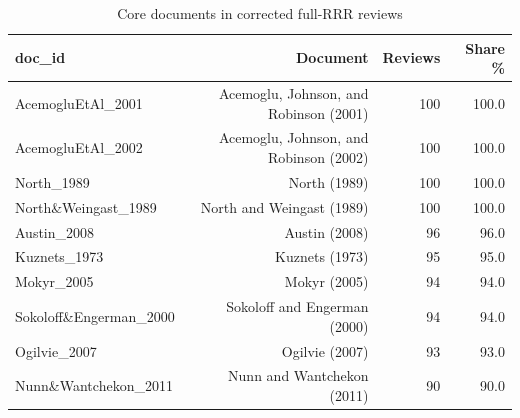 \begin{table}[ht]
\centering
\caption{Core documents in corrected full-RRR reviews}
\scriptsize
\begin{tabular}{lrrr}
\toprule
doc\_id & Document & Reviews & Share \% \\
\midrule
AcemogluEtAl\_2001 & Acemoglu, Johnson, and Robinson (2001) & 100 & 100.0 \\
AcemogluEtAl\_2002 & Acemoglu, Johnson, and Robinson (2002) & 100 & 100.0 \\
North\_1989 & North (1989) & 100 & 100.0 \\
North\&Weingast\_1989 & North and Weingast (1989) & 100 & 100.0 \\
Austin\_2008 & Austin (2008) & 96 & 96.0 \\
Kuznets\_1973 & Kuznets (1973) & 95 & 95.0 \\
Mokyr\_2005 & Mokyr (2005) & 94 & 94.0 \\
Sokoloff\&Engerman\_2000 & Sokoloff and Engerman (2000) & 94 & 94.0 \\
Ogilvie\_2007 & Ogilvie (2007) & 93 & 93.0 \\
Nunn\&Wantchekon\_2011 & Nunn and Wantchekon (2011) & 90 & 90.0 \\
\bottomrule
\end{tabular}
\end{table}
